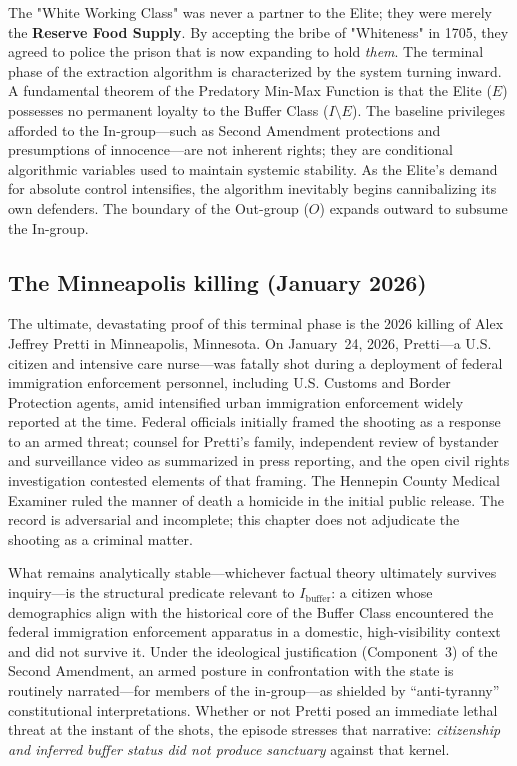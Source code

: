 \documentclass[12pt,openany]{book}
\begin{document}
The "White Working Class" was never a partner to the Elite; they were merely the \textbf{Reserve Food Supply}. By accepting the bribe of "Whiteness" in 1705, they agreed to police the prison that is now expanding to hold \textit{them}. The terminal phase of the extraction algorithm is characterized by the system turning inward. A fundamental theorem of the Predatory Min-Max Function is that the Elite ($E$) possesses no permanent loyalty to the Buffer Class ($I \setminus E$). The baseline privileges afforded to the In-group—such as Second Amendment protections and presumptions of innocence—are not inherent rights; they are conditional algorithmic variables used to maintain systemic stability. As the Elite's demand for absolute control intensifies, the algorithm inevitably begins cannibalizing its own defenders. The boundary of the Out-group ($O$) expands outward to subsume the In-group.

\subsection{The Minneapolis killing (January 2026)}

The ultimate, devastating proof of this terminal phase is the 2026 killing of Alex Jeffrey Pretti in Minneapolis, Minnesota. On January~24, 2026, Pretti---a U.S. citizen and intensive care nurse---was fatally shot during a deployment of federal immigration enforcement personnel, including U.S. Customs and Border Protection agents, amid intensified urban immigration enforcement widely reported at the time. Federal officials initially framed the shooting as a response to an armed threat; counsel for Pretti's family, independent review of bystander and surveillance video as summarized in press reporting, and the open civil rights investigation contested elements of that framing. The Hennepin County Medical Examiner ruled the manner of death a homicide in the initial public release. The record is adversarial and incomplete; this chapter does not adjudicate the shooting as a criminal matter.

What remains analytically stable---whichever factual theory ultimately survives inquiry---is the structural predicate relevant to $I_{\text{buffer}}$: a citizen whose demographics align with the historical core of the Buffer Class encountered the federal immigration enforcement apparatus in a domestic, high-visibility context and did not survive it. Under the ideological justification (Component~3) of the Second Amendment, an armed posture in confrontation with the state is routinely narrated---for members of the in-group---as shielded by ``anti-tyranny'' constitutional interpretations. Whether or not Pretti posed an immediate lethal threat at the instant of the shots, the episode stresses that narrative: \textit{citizenship and inferred buffer status did not produce sanctuary} against that kernel.
\end{document}
